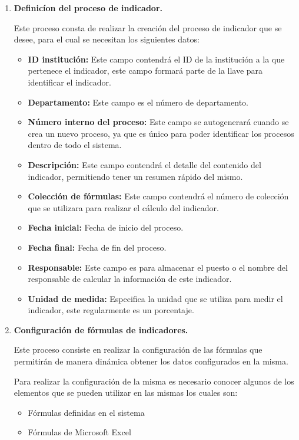 			    \begin{enumerate}[1.]
		    		\item \textbf{Definic\'ion del proceso de indicador.}

		    			Este proceso consta de realizar la creaci\'on del proceso de indicador que se desee, para el cual se necesitan los siguientes datos:
		    			\begin{itemize}
		    				\item \textbf{ID instituci\'on:} Este campo contendr\'a el ID de la instituci\'on a la que pertenece el indicador, este campo formar\'a parte de la llave para identificar el indicador.
		    				\item \textbf{Departamento:} Este campo es el n\'umero de departamento.
		    				\item \textbf{N\'umero interno del proceso:} Este campo se autogenerar\'a cuando se crea un nuevo proceso, ya que es \'unico para poder identificar los procesos dentro de todo el sistema.
		    				\item \textbf{Descripci\'on:} Este campo contendr\'a el detalle del contenido del indicador, permitiendo tener un resumen r\'apido del mismo.
		    				\item \textbf{Colecci\'on de f\'ormulas:} Este campo contendr\'a el n\'umero de colecci\'on que se utilizara para realizar el c\'alculo del indicador.
		    				\item \textbf{Fecha inicial:} Fecha de inicio del proceso.
		    				\item \textbf{Fecha final:} Fecha de fin del proceso.
		    				\item \textbf{Responsable:} Este campo es para almacenar el puesto o el nombre del responsable de calcular la informaci\'on de este indicador.
		    				\item \textbf{Unidad de medida:} Especifica la unidad que se utiliza para medir el indicador, este regularmente es un porcentaje.
		    			\end{itemize}

		    		\item \textbf{Configuraci\'on de f\'ormulas de indicadores.}

		    			Este proceso consiste en realizar la configuraci\'on de las f\'ormulas que permitir\'an de manera din\'amica obtener los datos configurados en la misma.

						Para realizar la configuraci\'on de la misma es necesario conocer algunos de los elementos que se pueden utilizar en las mismas los cuales son:
						\begin{itemize}
							\item F\'ormulas definidas en el sistema
							\item F\'ormulas de  Microsoft Excel
						\end{itemize}


\end{enumerate}
